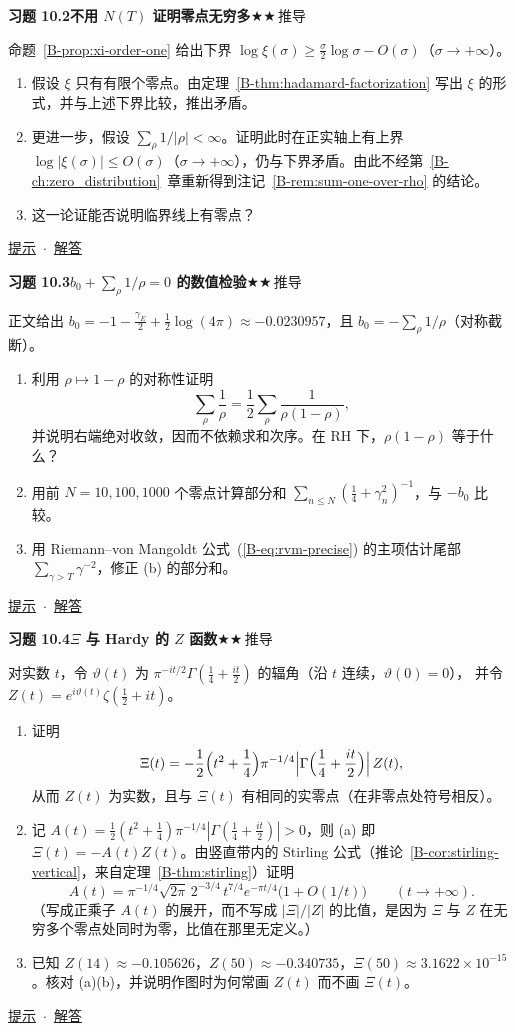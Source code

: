 \documentclass[11pt,a4paper]{article}
\newcommand{\bref}[1]{\ref*{B-#1}}
\newcommand{\lvII}{$\bigstar\bigstar$\,推导}
\newcommand{\Q}[3]{%
  \par\addvspace{1.1em}\noindent
  \hypertarget{q:#1}{}\textbf{习题 #1}\quad\textbf{#3}\hfill{\small #2}\par
  \nopagebreak\smallskip}
\newcommand{\toHint}[1]{\hfill{\small\hyperlink{h:#1}{提示}\ $\cdot$\ \hyperlink{s:#1}{解答}}}
\begin{document}
\Q{10.2}{\lvII}{不用 $N(T)$ 证明零点无穷多}
命题~\bref{prop:xi-order-one} 给出下界 $\log\xi(\sigma)\ge\frac\sigma2\log\sigma-O(\sigma)$（$\sigma\to+\infty$）。
\begin{enumerate}
  \item 假设 $\xi$ 只有有限个零点。由定理~\bref{thm:hadamard-factorization} 写出 $\xi$ 的形式，并与上述下界比较，推出矛盾。
  \item 更进一步，假设 $\sum_\rho1/|\rho|<\infty$。证明此时在正实轴上有上界 $\log|\xi(\sigma)|\le O(\sigma)$（$\sigma\to+\infty$），仍与下界矛盾。由此不经第~\bref{ch:zero_distribution}~章重新得到注记~\bref{rem:sum-one-over-rho} 的结论。
  \item 这一论证能否说明临界线上有零点？
\end{enumerate}
\toHint{10.2}

\Q{10.3}{\lvII}{$b_0+\sum_\rho1/\rho=0$ 的数值检验}
正文给出 $b_0=-1-\frac{\gamma_E}2+\frac12\log(4\pi)\approx-0.0230957$，且 $b_0=-\sum_\rho1/\rho$（对称截断）。
\begin{enumerate}
  \item 利用 $\rho\mapsto1-\rho$ 的对称性证明
  \[
    \sum_\rho\frac1\rho=\frac12\sum_\rho\frac1{\rho(1-\rho)},
  \]
  并说明右端绝对收敛，因而不依赖求和次序。在 RH 下，$\rho(1-\rho)$ 等于什么？
  \item 用前 $N=10,100,1000$ 个零点计算部分和 $\sum_{n\le N}(\tfrac14+\gamma_n^2)^{-1}$，与 $-b_0$ 比较。
  \item 用 Riemann--von Mangoldt 公式~(\bref{eq:rvm-precise}) 的主项估计尾部 $\sum_{\gamma>T}\gamma^{-2}$，修正 (b) 的部分和。
\end{enumerate}
\toHint{10.3}

\Q{10.4}{\lvII}{$\Xi$ 与 Hardy 的 $Z$ 函数}
对实数 $t$，令 $\vartheta(t)$ 为 $\pi^{-it/2}\Gamma(\tfrac14+\tfrac{it}2)$ 的辐角（沿 $t$ 连续，$\vartheta(0)=0$），
并令 $Z(t)=e^{i\vartheta(t)}\zeta(\tfrac12+it)$。
\begin{enumerate}
  \item 证明
  \[
    \Xi(t)=-\frac12\Bigl(t^2+\frac14\Bigr)\pi^{-1/4}\Bigl|\Gamma\Bigl(\frac14+\frac{it}2\Bigr)\Bigr|\,Z(t),
  \]
  从而 $Z(t)$ 为实数，且与 $\Xi(t)$ 有相同的实零点（在非零点处符号相反）。
  \item 记 $A(t)=\frac12(t^2+\frac14)\pi^{-1/4}|\Gamma(\frac14+\frac{it}2)|>0$，则 (a) 即 $\Xi(t)=-A(t)Z(t)$。由竖直带内的 Stirling 公式（推论~\bref{cor:stirling-vertical}，来自定理~\bref{thm:stirling}）证明
  \[
    A(t)=\pi^{-1/4}\sqrt{2\pi}\,2^{-3/4}\,t^{7/4}e^{-\pi t/4}\bigl(1+O(1/t)\bigr)\qquad(t\to+\infty).
  \]
  （写成正乘子 $A(t)$ 的展开，而不写成 $|\Xi|/|Z|$ 的比值，是因为 $\Xi$ 与 $Z$ 在无穷多个零点处同时为零，比值在那里无定义。）
  \item 已知 $Z(14)\approx-0.105626$，$Z(50)\approx-0.340735$，$\Xi(50)\approx3.1622\times10^{-15}$。核对 (a)(b)，并说明作图时为何常画 $Z(t)$ 而不画 $\Xi(t)$。
\end{enumerate}
\toHint{10.4}
\end{document}
